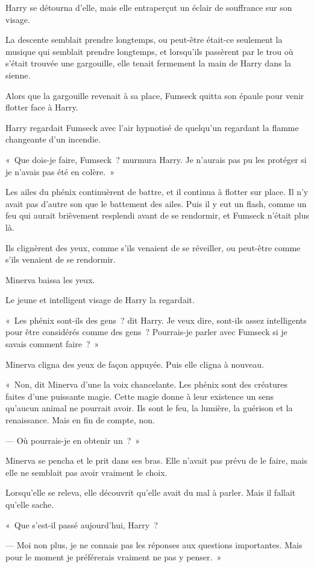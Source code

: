 Harry se détourna d'elle, mais elle entraperçut un éclair de souffrance sur son visage.

La descente semblait prendre longtemps, ou peut-être était-ce seulement la musique qui semblait prendre longtemps, et lorsqu'ils passèrent par le trou où s'était trouvée une gargouille, elle tenait fermement la main de Harry dans la sienne.

Alors que la gargouille revenait à sa place, Fumseck quitta son épaule pour venir flotter face à Harry.

Harry regardait Fumseck avec l'air hypnotisé de quelqu'un regardant la flamme changeante d'un incendie.

«~Que dois-je faire, Fumseck~? murmura Harry.
Je n'aurais pas pu les protéger si je n'avais pas été en colère.~»

Les ailes du phénix continuèrent de battre, et il continua à flotter sur place.
Il n'y avait pas d'autre son que le battement des ailes.
Puis il y eut un flash, comme un feu qui aurait brièvement resplendi avant de se rendormir, et Fumseck n'était plus là.

Ils clignèrent des yeux, comme s'ils venaient de se réveiller, ou peut-être comme s'ils venaient de se rendormir.

Minerva baissa les yeux.

Le jeune et intelligent visage de Harry la regardait.

«~Les phénix sont-ils des gens~? dit Harry.
Je veux dire, sont-ils assez intelligents pour être considérés comme des gens~?
Pourrais-je parler avec Fumseck si je savais comment faire~?~»

Minerva cligna des yeux de façon appuyée.
Puis elle cligna à nouveau.

«~Non, dit Minerva d'une la voix chancelante.
Les phénix sont des créatures faites d'une puissante magie.
Cette magie donne à leur existence un sens qu'aucun animal ne pourrait avoir.
Ils sont le feu, la lumière, la guérison et la renaissance.
Mais en fin de compte, non.

--- Où pourrais-je en obtenir un~?~»

Minerva se pencha et le prit dans ses bras.
Elle n'avait pas prévu de le faire, mais elle ne semblait pas avoir vraiment le choix.

Lorsqu'elle se releva, elle découvrit qu'elle avait du mal à parler.
Mais il fallait qu'elle sache.

«~Que s'est-il passé aujourd'hui, Harry~?

--- Moi non plus, je ne connais pas les réponses aux questions importantes.
Mais pour le moment je préférerais vraiment ne pas y penser.~»

